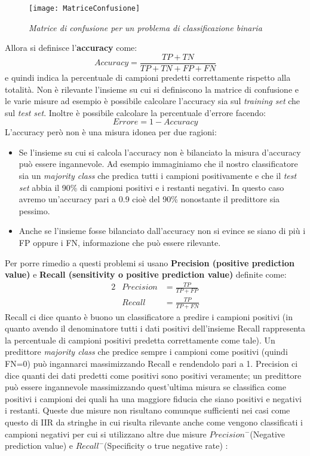 \begin{figure}[htp]
	\centering
	\texttt{[image: MatriceConfusione]}
	\caption[Matrice di confusione]{\textit{Matrice di confusione per un problema di classificazione binaria}}
   \label{fig:mco}
\end{figure}

Allora si definisce l'\textbf{accuracy} come:
\begin{equation*}
Accuracy = \frac{TP + TN}{TP+TN+FP+FN}
\end{equation*}
e quindi indica la percentuale di campioni predetti correttamente rispetto alla totalità. Non è rilevante l'insieme su cui si definiscono la matrice di confusione e le varie misure ad esempio è possibile calcolare l'accuracy sia sul \textit{training set} che sul \textit{test set}. Inoltre è possibile calcolare la percentuale d'errore facendo:
\begin{equation*}
Errore = 1 - Accuracy
\end{equation*}
 L'accuracy però non è una misura idonea per due ragioni:
 \begin{itemize}
 \item Se l'insieme su cui si calcola l'accuracy non è bilanciato la misura d'accuracy può essere ingannevole. Ad esempio immaginiamo che il nostro classificatore sia un \textit{majority class} che predica tutti i campioni positivamente e che il \textit{test set} abbia il 90\% di campioni positivi e i restanti negativi. In questo caso avremo un'accuracy pari a 0.9 cioè del 90\% nonostante il predittore sia pessimo.
 \item Anche se l'insieme fosse bilanciato dall'accuracy non si evince se siano di più i FP oppure i FN, informazione che può essere rilevante.
 \end{itemize}
Per porre rimedio a questi problemi si usano \textbf{Precision (positive prediction value)} e \textbf{Recall (sensitivity o positive prediction value)} definite come:
\begin{alignat*}{2}
& Precision &= \frac{TP}{TP+FP}\\
& Recall &= \frac{TP}{TP+FN}
\end{alignat*}
Recall ci dice quanto è buono un classificatore a predire i campioni positivi (in quanto avendo il denominatore tutti i dati positivi dell'insieme Recall rappresenta la percentuale di campioni positivi predetta correttamente come tale). Un predittore \textit{majority class} che predice sempre i campioni come positivi (quindi FN=0) può ingannarci massimizzando Recall e rendendolo pari a 1. Precision ci dice quanti dei dati predetti come positivi sono positivi veramente; un predittore può essere ingannevole massimizzando quest'ultima misura se classifica come positivi i campioni dei quali ha una maggiore fiducia che siano positivi e negativi i restanti. Queste due misure non risultano comunque sufficienti nei casi come questo di \ac{IIR} da stringhe in cui risulta rilevante anche come vengono classificati i campioni negativi per cui si utilizzano altre due misure $Precision^{-}$(Negative prediction value) e $Recall^{-}$(Specificity o true negative rate) \cite{Bogdanov08} :
